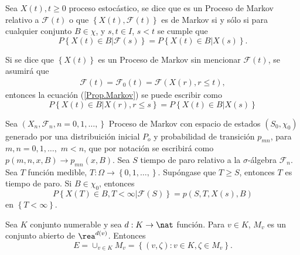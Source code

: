 \begin{Def}
Sea $X\left(t\right),t\geq0$ proceso estoc\'astico, se dice que es
un Proceso de Markov relativo a $\mathcal{F}\left(t\right)$ o que
$\left\{X\left(t\right),\mathcal{F}\left(t\right)\right\}$ es de
Markov si y s\'olo si para cualquier conjunto $B\in\chi$,  y
$s,t\in I$, $s<t$ se cumple que
\begin{equation}\label{Prop.Markov}
P\left\{X\left(t\right)\in
B|\mathcal{F}\left(s\right)\right\}=P\left\{X\left(t\right)\in
B|X\left(s\right)\right\}.
\end{equation}
\end{Def}
\begin{Note}
Si se dice que $\left\{X\left(t\right)\right\}$ es un Proceso de
Markov sin mencionar $\mathcal{F}\left(t\right)$, se asumir\'a que
\begin{eqnarray*}
\mathcal{F}\left(t\right)=\mathcal{F}_{0}\left(t\right)=\mathcal{F}\left(X\left(r\right),r\leq
t\right),
\end{eqnarray*}
entonces la ecuaci\'on (\ref{Prop.Markov}) se puede escribir como
\begin{equation}
P\left\{X\left(t\right)\in B|X\left(r\right),r\leq s\right\} =
P\left\{X\left(t\right)\in B|X\left(s\right)\right\}
\end{equation}
\end{Note}

\begin{Teo}
Sea $\left(X_{n},\mathcal{F}_{n},n=0,1,\ldots,\right\}$ Proceso de
Markov con espacio de estados $\left(S_{0},\chi_{0}\right)$
generado por una distribuici\'on inicial $P_{o}$ y probabilidad de
transici\'on $p_{mn}$, para $m,n=0,1,\ldots,$ $m<n$, que por
notaci\'on se escribir\'a como $p\left(m,n,x,B\right)\rightarrow
p_{mn}\left(x,B\right)$. Sea $S$ tiempo de paro relativo a la
$\sigma$-\'algebra $\mathcal{F}_{n}$. Sea $T$ funci\'on medible,
$T:\Omega\rightarrow\left\{0,1,\ldots,\right\}$. Sup\'ongase que
$T\geq S$, entonces $T$ es tiempo de paro. Si $B\in\chi_{0}$,
entonces
\begin{equation}\label{Prop.Fuerte.Markov}
P\left\{X\left(T\right)\in
B,T<\infty|\mathcal{F}\left(S\right)\right\} =
p\left(S,T,X\left(s\right),B\right)
\end{equation}
en $\left\{T<\infty\right\}$.
\end{Teo}


Sea $K$ conjunto numerable y sea $d:K\rightarrow\nat$ funci\'on.
Para $v\in K$, $M_{v}$ es un conjunto abierto de
$\rea^{d\left(v\right)}$. Entonces \[E=\cup_{v\in
K}M_{v}=\left\{\left(v,\zeta\right):v\in K,\zeta\in
M_{v}\right\}.\]

